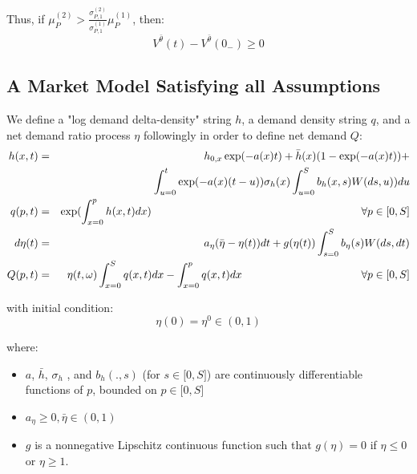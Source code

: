 \documentclass{article}
\begin{document}
Thus, if $\mu _{P}^{(2)}>\frac{\sigma _{P,1}^{(2)}}{\sigma _{P,1}^{(1)}}\mu
_{P}^{(1)}$, then:
\begin{equation*}
V^{\bar{\theta}}(t)-V^{\bar{\theta}}(0_{-})\geq 0
\end{equation*}

\subsection{A Market Model Satisfying all Assumptions}

We define a "log demand delta-density" string $h$, a demand density string $q
$, and a net demand ratio process $\eta $ followingly in order to define net
demand $Q$:%
\begin{eqnarray}
h(x,t) &=&h_{0,x}\exp (-a(x)t)+\bar{h}(x)(1-\exp (-a(x)t))+  \label{equ_h_A}
\\
&&\int_{u=0}^{t}\exp (-a(x)(t-u))\sigma
_{h}(x)\int_{u=0}^{S}b_{h}(x,s)W(ds,u))du  \notag \\
q(p,t) &=&\exp ({\int_{x=0}^{p}h(x,t)dx)}\text{ \ \ \ \ \ \ \ \ \ \ \ \ \ \
\ \ \ \ \ \ \ \ \ \ \ \ \ \ \ \ \ \ \ \ \ \ \ \ \ \ \ \ \ \ \ \ \ \ \ \ \ \
\ \ \ }\forall p\in \lbrack 0,S]  \label{equ_q_A} \\
d\eta (t) &=&a_{\eta }(\bar{\eta}-\eta (t))dt+g(\eta (t))\int_{s=0}^{S}b_{\eta
}(s)W(ds,dt)  \label{equ_eta_A_bis} \\
Q(p,t) &=&\eta (t,\omega )\int_{x=0}^{S}q(x,t)dx-\int_{x=0}^{p}q(x,t)dx\text{
\ \ \ \ \ \ \ \ \ \ \ \ } \qquad\qquad\qquad \forall p\in \lbrack 0,S]  \label{equ_Q_A}
\end{eqnarray}

with initial condition:%
\begin{equation}
\eta (0)=\eta ^{0}\in (0,1)
\end{equation}

where:

\begin{itemize}
\item $a$, $\bar{h}$, $\sigma _{h}$ , and $b_{h}(.,s)$ (for $s\in \lbrack
0,S]$) are continuously differentiable functions of $p$, bounded on $p\in
\lbrack 0,S]$

\item $a_{\eta }\geq 0,\bar{\eta}\in (0,1)$

\item $g$ is a nonnegative Lipschitz continuous function such that $g(\eta
)=0$ if $\eta \leq 0$ or $\eta \geq 1$.
\end{itemize}
\end{document}

